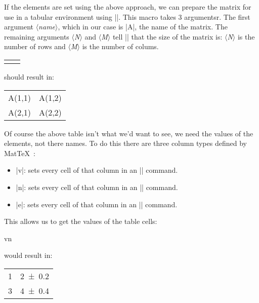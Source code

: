 \documentclass[a4paper,10pt]{article}
\newcommand{\mt}{Mat\TeX\ }
\newcommand\argu[1]{{\color{black}$\langle$\textit{#1}$\rangle$}}
\begin{document}
If the elements are set using the above approach, we can prepare the matrix for use in a tabular environment using |\preparematrix|. This macro takes 3 argumentsr. The first argument \argu{name}, which in our case is |A|, the name of the matrix. The remaining arguments \argu{N} and \argu{M} tell |\preparematrix| that the size of the matrix is: \argu{N} is the number of rows and \argu{M} is the number of colums.
\begin{center}
	\begin{texcode}
		\begin{tabular}{cc}
			\noheader
			\hline
			\usematrix
			\hline
		\end{tabular}
	\end{texcode}
\end{center}
	
should result in:
\begin{table}[h]
\centering
	\begin{tabular}{cc}
		\hline
		A(1,1) & A(1,2) \\
		A(2,1) & A(2,2) \\
		\hline
	\end{tabular}
\end{table}

Of course the above table isn't what we'd want to see, we need the values of the elements, not there names. To do this there are three column types defined by \mt:
\begin{itemize}
	\item |v|: sets every cell of that column in an |\Mval| command.
	\item |n|: sets every cell of that column in an |\Mnum| command.
	\item |e|: sets every cell of that column in an |\Merr| command.
\end{itemize}

This allows us to get the values of the table cells:
\begin{center}
	\begin{texcode}
		\preparematrixmatrix{A}{2}{2}
		\begin{tabular}{vn}
			\noheader
			\hline
			\usematrix
			\hline
		\end{tabular}
	\end{texcode}
\end{center}
would result in:
\begin{table}[h]
\centering
	\begin{tabular}{cc}
		\hline
		\num{1} & \num{2+-0.2} \\
		\num{3} & \num{4+-0.4} \\
		\hline
	\end{tabular}
\end{table}
\end{document}
